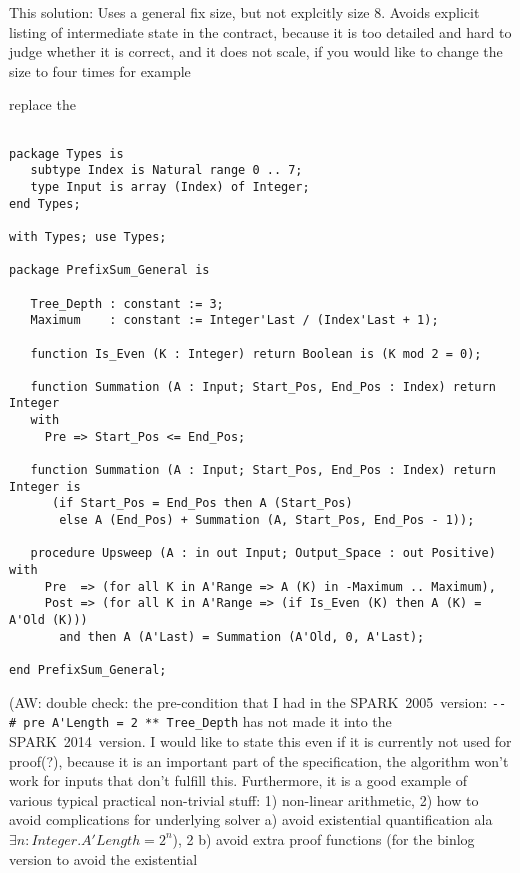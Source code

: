 \documentclass[sttt,draft]{svjour}
\newcommand{\oldspark}{SPARK~2005\xspace}
\newcommand{\newspark}{SPARK~2014\xspace}
\begin{document}
This solution: Uses a general fix size, but not explcitly size 8.
Avoids explicit listing of intermediate state in the contract, because
it is too detailed and hard to judge whether it is correct, and it
does not scale, if you would like to change the size to four times for
example

replace the

\begin{footnotesize}
\begin{verbatim}

package Types is
   subtype Index is Natural range 0 .. 7;
   type Input is array (Index) of Integer;
end Types;

with Types; use Types;

package PrefixSum_General is

   Tree_Depth : constant := 3;
   Maximum    : constant := Integer'Last / (Index'Last + 1);

   function Is_Even (K : Integer) return Boolean is (K mod 2 = 0);

   function Summation (A : Input; Start_Pos, End_Pos : Index) return Integer
   with
     Pre => Start_Pos <= End_Pos;

   function Summation (A : Input; Start_Pos, End_Pos : Index) return Integer is
      (if Start_Pos = End_Pos then A (Start_Pos)
       else A (End_Pos) + Summation (A, Start_Pos, End_Pos - 1));

   procedure Upsweep (A : in out Input; Output_Space : out Positive) with
     Pre  => (for all K in A'Range => A (K) in -Maximum .. Maximum),
     Post => (for all K in A'Range => (if Is_Even (K) then A (K) = A'Old (K)))
       and then A (A'Last) = Summation (A'Old, 0, A'Last);

end PrefixSum_General;

\end{verbatim}
\end{footnotesize}
%
(AW: double check: the pre-condition that I had in the \oldspark\
version: \verb|--# pre A'Length = 2 ** Tree_Depth| has not made it
into the \newspark\ version. I would like to state this even if it is
currently not used for proof(?), because it is an important part of
the specification, the algorithm won't work for inputs that don't
fulfill this. Furthermore, it is a good example of various typical
practical non-trivial stuff: 1) non-linear arithmetic, 2) how to avoid
complications for underlying solver a) avoid existential
quantification ala $\exists n: Integer. A'Length = 2^n$), 2 b) avoid
extra proof functions (for the binlog version to avoid the existential
\end{document}
